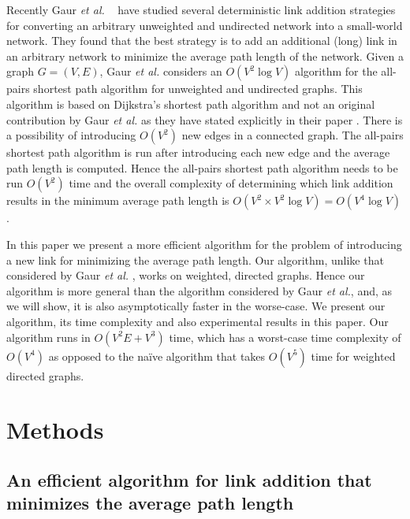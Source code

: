 \documentclass[10pt,letterpaper]{article}
\begin{document}
Recently Gaur {\em et al.} ~\cite{GCM} have studied several deterministic link addition strategies 
for converting an arbitrary unweighted and undirected network into a small-world network. They found that 
the best strategy is  
to add an additional (long) link in an arbitrary network to minimize 
the average path length of the network. 
Given a graph $G=(V,E)$, 
Gaur {\em et al.} \cite{GCM} considers an $O(V^2\log V)$ algorithm for the all-pairs 
shortest path algorithm for unweighted and undirected graphs. This algorithm is based 
on Dijkstra's shortest path algorithm and not an original contribution by Gaur {\em et al.} as 
they have stated explicitly in their paper \cite{GCM}. 
There is a possibility of introducing 
$O(V^2)$ new edges in a connected graph. The all-pairs shortest path 
algorithm is run after introducing each new edge and the average path length is computed. 
Hence the all-pairs shortest path algorithm needs to be run $O(V^2)$ time and the overall 
complexity of determining which link addition results in the minimum average path length is 
$O(V^2\times V^2\log V)=O(V^4\log V)$. 

In this paper we present a more efficient algorithm for the problem of introducing a new link 
for minimizing the average path length. Our algorithm, unlike that considered by 
Gaur {\em et al.} \cite{GCM}, works on weighted, directed graphs. Hence our algorithm is more general than 
the algorithm considered by Gaur {\em et al.}\cite{GCM}, and, as we will show, it is also asymptotically faster in the worse-case. We present our algorithm, its time complexity and also 
experimental results in this paper. Our algorithm runs in $O(V^2E+V^3)$ time, which has a 
worst-case time complexity of $O(V^4)$ as opposed to the na\"ive algorithm that takes $O(V^5)$
time for weighted directed graphs.   


\section*{Methods}
\subsection*{An efficient algorithm for link addition that minimizes the average path length}
\end{document}
